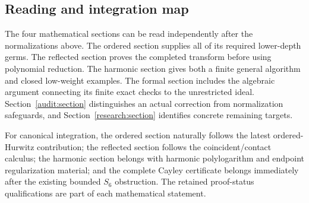 \subsection{Reading and integration map}

The four mathematical sections can be read independently after the
normalizations above. The ordered section supplies all of its required
lower-depth germs. The reflected section proves the completed transform
before using polynomial reduction. The harmonic section gives both a
finite general algorithm and closed low-weight examples. The formal
section includes the algebraic argument connecting its finite exact
checks to the unrestricted ideal. Section~\ref{audit:section} distinguishes
an actual correction from normalization safeguards, and
Section~\ref{research:section} identifies concrete remaining targets.

For canonical integration, the ordered section naturally follows the
latest ordered-Hurwitz contribution; the reflected section follows the
coincident/contact calculus; the harmonic section belongs with harmonic
polylogarithm and endpoint regularization material; and the complete
Cayley certificate belongs immediately after the existing bounded
$S_6$ obstruction. The retained proof-status qualifications are part of
each mathematical statement.
